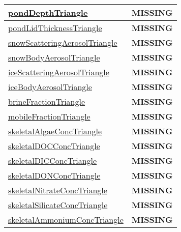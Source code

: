 {\begin{center}
\begin{longtable}{| p{2.0in} | p{4.0in} |}
    \hline
    \hyperref[subsec:var_sec_tracer_triangles_pondDepthTriangle]{pondDepthTriangle} & {\bf \color{red} MISSING} \\
    \hline
    \hyperref[subsec:var_sec_tracer_triangles_pondLidThicknessTriangle]{pondLidThicknessTriangle} & {\bf \color{red} MISSING} \\
    \hline
    \hyperref[subsec:var_sec_tracer_triangles_snowScatteringAerosolTriangle]{snowScatteringAerosolTriangle} & {\bf \color{red} MISSING} \\
    \hline
    \hyperref[subsec:var_sec_tracer_triangles_snowBodyAerosolTriangle]{snowBodyAerosolTriangle} & {\bf \color{red} MISSING} \\
    \hline
    \hyperref[subsec:var_sec_tracer_triangles_iceScatteringAerosolTriangle]{iceScatteringAerosolTriangle} & {\bf \color{red} MISSING} \\
    \hline
    \hyperref[subsec:var_sec_tracer_triangles_iceBodyAerosolTriangle]{iceBodyAerosolTriangle} & {\bf \color{red} MISSING} \\
    \hline
    \hyperref[subsec:var_sec_tracer_triangles_brineFractionTriangle]{brineFractionTriangle} & {\bf \color{red} MISSING} \\
    \hline
    \hyperref[subsec:var_sec_tracer_triangles_mobileFractionTriangle]{mobileFractionTriangle} & {\bf \color{red} MISSING} \\
    \hline
    \hyperref[subsec:var_sec_tracer_triangles_skeletalAlgaeConcTriangle]{skeletalAlgaeConcTriangle} & {\bf \color{red} MISSING} \\
    \hline
    \hyperref[subsec:var_sec_tracer_triangles_skeletalDOCConcTriangle]{skeletalDOCConcTriangle} & {\bf \color{red} MISSING} \\
    \hline
    \hyperref[subsec:var_sec_tracer_triangles_skeletalDICConcTriangle]{skeletalDICConcTriangle} & {\bf \color{red} MISSING} \\
    \hline
    \hyperref[subsec:var_sec_tracer_triangles_skeletalDONConcTriangle]{skeletalDONConcTriangle} & {\bf \color{red} MISSING} \\
    \hline
    \hyperref[subsec:var_sec_tracer_triangles_skeletalNitrateConcTriangle]{skeletalNitrateConcTriangle} & {\bf \color{red} MISSING} \\
    \hline
    \hyperref[subsec:var_sec_tracer_triangles_skeletalSilicateConcTriangle]{skeletalSilicateConcTriangle} & {\bf \color{red} MISSING} \\
    \hline
    \hyperref[subsec:var_sec_tracer_triangles_skeletalAmmoniumConcTriangle]{skeletalAmmoniumConcTriangle} & {\bf \color{red} MISSING} \\

\end{longtable}
\end{center}}
